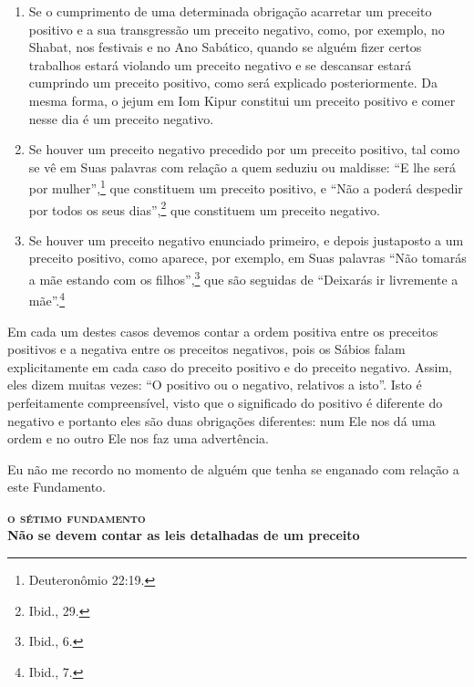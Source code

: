 \begin{enumerate}
\def\labelenumi{\arabic{enumi}.}
\item
  Se o cumprimento de uma determinada obrigação acarretar um preceito
  positivo e a sua transgressão um preceito negativo, como, por
  exemplo, no Shabat, nos festivais e no Ano Sabático, quando se alguém
  fizer certos trabalhos estará violando um preceito negativo e se
  descansar estará cumprindo um preceito positivo, como será explicado
  posteriormente. Da mesma forma, o jejum em Iom Kipur\starr{} constitui um
  preceito positivo e comer nesse dia é um preceito negativo.

\item
  Se houver um preceito negativo precedido por um preceito positivo,
  tal como se vê em Suas palavras com relação a quem seduziu ou
  maldisse: ``E lhe será por mulher'',\footnote{Deuteronômio 22:19.} que
  constituem um preceito positivo, e ``Não a poderá despedir por todos
  os seus dias'',\footnote{Ibid., 29.} que constituem um preceito negativo.

\item
  Se houver um preceito negativo enunciado primeiro, e depois
  justaposto a um preceito positivo, como aparece, por exemplo, em Suas
  palavras ``Não tomarás a mãe estando com os filhos'',\footnote{Ibid., 6.} que
  são seguidas de ``Deixarás ir livremente a mãe''.\footnote{Ibid., 7.}
\end{enumerate}

Em cada um destes casos devemos contar a ordem positiva entre os
preceitos positivos e a negativa entre os preceitos negativos, pois os
Sábios falam explicitamente em cada caso do preceito positivo e do preceito
negativo. Assim, eles dizem muitas vezes: ``O positivo ou o negativo,
relativos a isto''. Isto é perfeitamente compreensível, visto que o
significado do positivo é diferente do negativo e portanto eles são
duas obrigações diferentes: num Ele nos dá uma ordem e no outro Ele nos
faz uma advertência.

Eu não me recordo no momento de alguém que tenha se enganado com relação
a este Fundamento.


\bigskip

\noindent\textbf{\textsc{o sétimo fundamento}\\Não se devem contar as leis detalhadas de um preceito}

